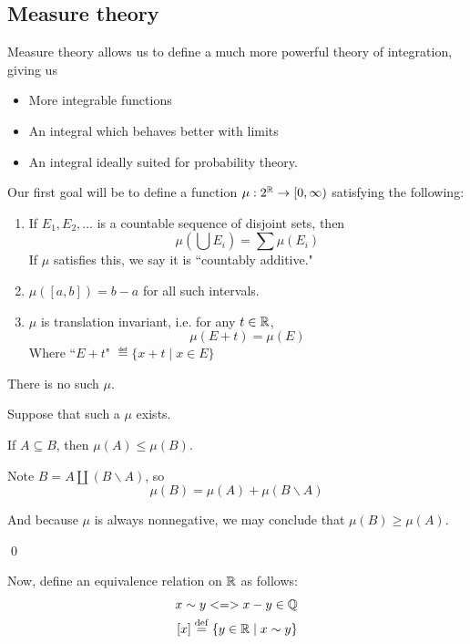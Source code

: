 \documentclass[x11names,reqno,14pt]{extarticle}
\begin{document}
\subsection*{Measure theory}

Measure theory allows us to define a much more powerful theory of integration, giving us 
\begin{itemize}
\item More integrable functions
\item An integral which behaves better with limits
\item An integral ideally suited for probability theory. 
\end{itemize}

Our first goal will be to define a function $\mu:2^{\mathbb{R}}\to[0,\infty)$ satisfying the following:

\begin{enumerate}
\item If $E_1, E_2, \dots$ is a countable sequence of disjoint sets, then 
\[
\mu\left(\bigcup E_i \right) = \sum\mu(E_i)
\]
If $\mu$ satisfies this, we say it is ``countably additive."

\item $\mu([a, b]) = b - a$ for all such intervals. 

\item $\mu$ is translation invariant, i.e. for any $t \in \mathbb{R}$, 
\[
\mu(E + t) = \mu(E)
\]
Where ``$E + t$" $\eqdef\{x + t \mid x \in E\}$
\end{enumerate}

 There is no such $\mu$.



\proof

Suppose that such a $\mu$ exists. 

\claim

If $A \subseteq B$, then $\mu(A) \leq \mu(B)$.

\proof

Note $B = A \coprod (B \backslash A)$, so 
\[
\mu(B) = \mu(A) + \mu(B \backslash A)
\]

And because $\mu$ is always nonnegative, we may conclude that $\mu(B) \geq \mu(A)$. 

\qed

Now, define an equivalence relation on $\mathbb{R}$ as follows:
\begin{align*}
x \sim y <=> x - y \in \mathbb{Q} \\
[x] \overset{\mathrm{def}}{=} \{y \in \mathbb{R} \mid x \sim y\}
\end{align*}
\end{document}
